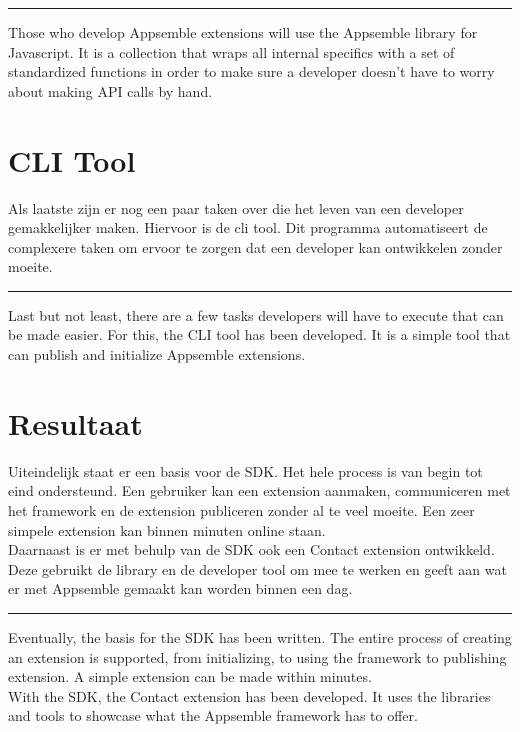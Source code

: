 \noindent\rule[0.5ex]{\linewidth}{1pt}

Those who develop Appsemble extensions will use the Appsemble library for Javascript.  It is a collection that  wraps all internal specifics with a set of standardized functions in order to make sure a developer doesn't have to worry about making API calls by hand.

\section{CLI Tool}

Als laatste zijn er nog een paar taken over die het leven van een developer gemakkelijker maken. Hiervoor is de cli tool. Dit programma automatiseert de complexere taken om ervoor te zorgen dat een developer kan ontwikkelen zonder moeite.

\noindent\rule[0.5ex]{\linewidth}{1pt}

Last but not least, there are a few tasks developers will have to execute that can be made easier. For this, the CLI tool has been developed. It is a simple tool that can publish and initialize Appsemble extensions.

\section{Resultaat}

Uiteindelijk staat er een basis voor de SDK. Het hele process is van begin tot eind ondersteund. Een gebruiker kan een extension aanmaken, communiceren met het framework en de extension publiceren zonder al te veel moeite. Een zeer simpele extension kan binnen minuten online staan. \\

Daarnaast is er met behulp van de SDK ook een Contact extension ontwikkeld. Deze gebruikt de library en de developer tool om mee te werken en geeft aan wat er met Appsemble gemaakt kan worden binnen een dag.

\noindent\rule[0.5ex]{\linewidth}{1pt}

Eventually, the basis for the SDK has been written. The entire process of creating an extension is supported, from initializing, to using the framework to publishing extension. A simple extension can be made within minutes. \\

With the SDK, the Contact extension has been developed. It uses the libraries and tools to showcase what the Appsemble framework has to offer.